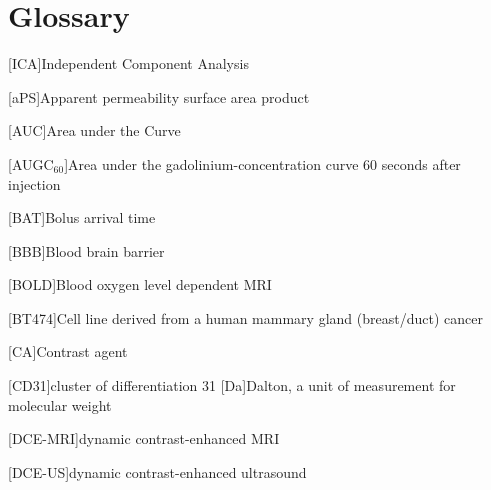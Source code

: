 
\chapter{Glossary}


\begin{acronym}

[ICA]{Independent Component Analysis}%

[aPS]{Apparent permeability surface area product}%

[AUC]{Area under the Curve}%

[AUGC$_{60}$]{Area under the gadolinium-concentration curve 60 seconds after injection}

[BAT]{Bolus arrival time}

[BBB]{Blood brain barrier}

[BOLD]{Blood oxygen level dependent MRI}

[BT474]{Cell line derived from a human mammary gland (breast/duct) cancer}

[CA]{Contrast agent}

[CD31]{cluster of differentiation 31}%
[Da]{Dalton, a unit of measurement for molecular weight}

[DCE-MRI]{dynamic contrast-enhanced MRI}

[DCE-US]{dynamic contrast-enhanced ultrasound}%


\end{acronym}
